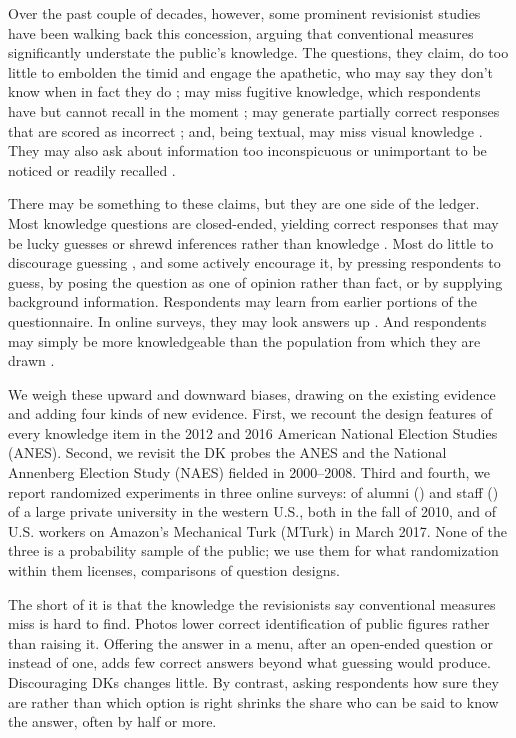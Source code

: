 \documentclass[11pt]{article}
\begin{document}
Over the past couple of decades, however, some prominent revisionist studies have been walking back this concession, arguing that conventional measures significantly understate the public's knowledge. The questions, they claim, do too little to embolden the timid and engage the apathetic, who may say they don't know when in fact they do \citep{mondak2001, prior2008}; may miss fugitive knowledge, which respondents have but cannot recall in the moment \citep{prior2008}; may generate partially correct responses that are scored as incorrect \citep{gibson2009, debell2013}; and, being textual, may miss visual knowledge \citep{prior2014}. They may also ask about information too inconspicuous or unimportant to be noticed or readily recalled \citep{lupia2016, boudreau2011}.

There may be something to these claims, but they are one side of the ledger. Most knowledge questions are closed-ended, yielding correct responses that may be lucky guesses or shrewd inferences rather than knowledge \citep{luskin2002, luskin2011, bullock2015, prior2015}. Most do little to discourage guessing \citep{luskin2011, cor2016}, and some actively encourage it, by pressing respondents to guess, by posing the question as one of opinion rather than fact, or by supplying background information. Respondents may learn from earlier portions of the questionnaire. In online surveys, they may look answers up \citep{clifford2016}. And respondents may simply be more knowledgeable than the population from which they are drawn \citep{krupnikov2014}.

We weigh these upward and downward biases, drawing on the existing evidence and adding four kinds of new evidence. First, we recount the design features of every knowledge item in the 2012 and 2016 American National Election Studies (ANES). Second, we revisit the DK probes the ANES and the National Annenberg Election Study (NAES) fielded in 2000--2008. Third and fourth, we report randomized experiments in three online surveys: of alumni (\nAlumni{}) and staff (\nStaff{}) of a large private university in the western U.S., both in the fall of 2010, and of \nMturk{} U.S. workers on Amazon's Mechanical Turk (MTurk) in March 2017. None of the three is a probability sample of the public; we use them for what randomization within them licenses, comparisons of question designs.

The short of it is that the knowledge the revisionists say conventional measures miss is hard to find. Photos lower correct identification of public figures rather than raising it. Offering the answer in a menu, after an open-ended question or instead of one, adds few correct answers beyond what guessing would produce. Discouraging DKs changes little. By contrast, asking respondents how sure they are rather than which option is right shrinks the share who can be said to know the answer, often by half or more.
\end{document}
